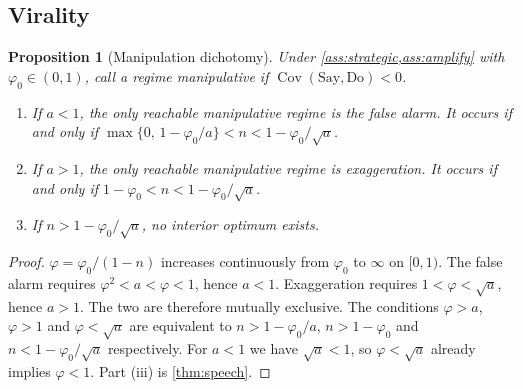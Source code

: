 \documentclass{article}
\theoremstyle{plain}
\newtheorem{proposition}[theorem]{Proposition}
\theoremstyle{definition}
\theoremstyle{remark}
\DeclareMathOperator{\Cov}{Cov}
\begin{document}
\subsection{Virality}
\begin{proposition}[Manipulation dichotomy]\label{prop:virality}
Under \cref{ass:strategic,ass:amplify} with $\varphi_0\in(0,1)$, call a regime \emph{manipulative} if $\Cov(\text{Say},\text{Do})<0$.
\begin{enumerate}[label=(\roman*)]
  \item If $a<1$, the only reachable manipulative regime is the false alarm. It occurs if and only if
  $\max\{0,\,1-\varphi_0/a\}<n<1-\varphi_0/\sqrt a$.
  \item If $a>1$, the only reachable manipulative regime is exaggeration. It occurs if and only if $1-\varphi_0<n<1-\varphi_0/\sqrt a$.
  \item If $n>1-\varphi_0/\sqrt a$, no interior optimum exists.
\end{enumerate}
\end{proposition}
\begin{proof}
$\varphi=\varphi_0/(1-n)$ increases continuously from $\varphi_0$ to $\infty$ on $[0,1)$. The false alarm requires $\varphi^2<a<\varphi<1$, hence $a<1$. Exaggeration requires $1<\varphi<\sqrt a$, hence $a>1$. The two are therefore mutually exclusive. The conditions $\varphi>a$, $\varphi>1$ and $\varphi<\sqrt a$ are equivalent to $n>1-\varphi_0/a$, $n>1-\varphi_0$ and $n<1-\varphi_0/\sqrt a$ respectively. For $a<1$ we have $\sqrt a<1$, so $\varphi<\sqrt a$ already implies $\varphi<1$. Part (iii) is \cref{thm:speech}.
\end{proof}
\end{document}
